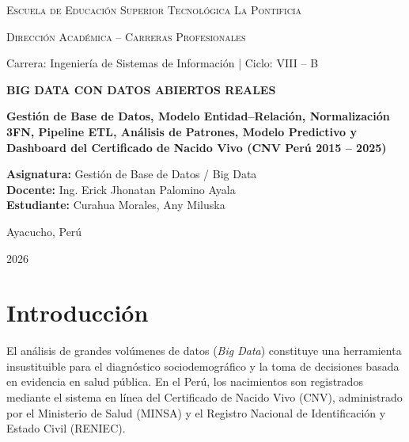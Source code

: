 \documentclass[12pt,a4paper]{article}
\begin{document}
\begin{titlepage}
    \centering
    \vspace*{0.5cm}
    {\scshape\LARGE Escuela de Educación Superior Tecnológica La Pontificia \par}
    \vspace{0.6cm}
    {\scshape\Large Dirección Académica -- Carreras Profesionales \par}
    \vspace{0.3cm}
    {\large Carrera: Ingeniería de Sistemas de Información | Ciclo: VIII -- B \par}
    \vspace{1.2cm}
    
    {\huge\bfseries BIG DATA CON DATOS ABIERTOS REALES\par}
    \vspace{0.4cm}
    {\Large\bfseries Gestión de Base de Datos, Modelo Entidad--Relación, Normalización 3FN, Pipeline ETL, Análisis de Patrones, Modelo Predictivo y Dashboard del Certificado de Nacido Vivo (CNV Perú 2015 -- 2025)\par}
    \vspace{1.5cm}
    
    \begin{flushleft}
        \large
        \textbf{Asignatura:} Gestión de Base de Datos / Big Data \\
        \textbf{Docente:} Ing. Erick Jhonatan Palomino Ayala \\
        \textbf{Estudiante:} Curahua Morales, Any Miluska
    \end{flushleft}
    
    \vfill
    {\large Ayacucho, Perú \par}
    {\large 2026 \par}
\end{titlepage}

\newpage
\tableofcontents
\newpage

\section{Introducción}

El análisis de grandes volúmenes de datos (\textit{Big Data}) constituye una herramienta insustituible para el diagnóstico sociodemográfico y la toma de decisiones basada en evidencia en salud pública. En el Perú, los nacimientos son registrados mediante el sistema en línea del Certificado de Nacido Vivo (CNV), administrado por el Ministerio de Salud (MINSA) y el Registro Nacional de Identificación y Estado Civil (RENIEC).
\end{document}
